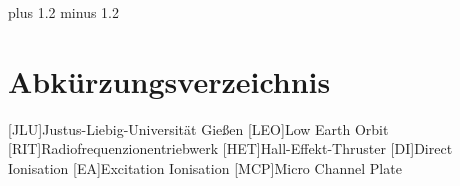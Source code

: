 \documentclass[fontsize=11pt,%
twoside,
BCOR          = 8mm]{scrreprt}
\author{Lorenz Saalmann}
\begin{document}
\noindent

\font plus 1.2\font
minus 1.2\font






\cleardoublepage

\tableofcontents
\cleardoublepage

\listoffigures
\listoftables
\chapter*{Abk\"{u}rzungsverzeichnis}
\begin{acronym}
[JLU]{\dotfill Justus-Liebig-Universit\"{a}t Gie{\ss}en}
[LEO]{\dotfill Low Earth Orbit}
[RIT]{\dotfill Radiofrequenzionentriebwerk}
[HET]{\dotfill Hall-Effekt-Thruster}
[DI]{\dotfill Direct Ionisation}
[EA]{\dotfill Excitation Ionisation}
[MCP]{\dotfill Micro Channel Plate}

\end{acronym}
\cleardoublepage

\onehalfspacing

\cleardoublepage





\fontsize{12pt}{12pt}\selectfont

\renewcommand\bibname{Literaturverzeichnis}
\clearpage
{}
{}

\printbibliography
\end{document}
